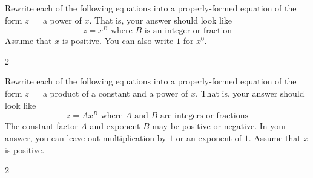 
Rewrite each of the following equations into a properly-formed equation of the form $z = $ a power of $x$.
That is, your answer should look like
\begin{equation*}
 z = x^B \text{ where $B$ is an integer or fraction}
\end{equation*}
Assume that $x$ is positive.
You can also write $1$ for $x^0$.

\begin{multicols}{2}
 \begin{ProblemSet}[pencil space=1in]
 \end{ProblemSet}
\end{multicols}

\newpage

Rewrite each of the following equations into a properly-formed equation of the form $z = $ a product of a constant and a power of $x$.
That is, your answer should look like
\begin{equation*}
 z = A x^B \text{ where $A$ and $B$ are integers or fractions}
\end{equation*}
The constant factor $A$ and exponent $B$ may be positive or negative.
In your answer, you can leave out multiplication by $1$ or an exponent of $1$.
Assume that $x$ is positive.

\begin{multicols}{2}
 \begin{ProblemSet}[pencil space=1.5in]
 \end{ProblemSet}
\end{multicols}

